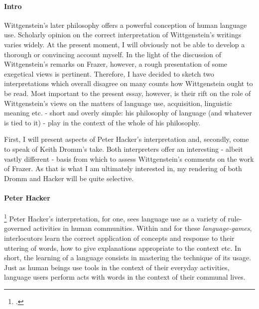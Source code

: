 \documentclass{article}
\begin{document}
\paragraph{Intro} Wittgenstein's later philosophy offers a powerful conception of human language use. Scholarly opinion on the correct interpretation of Wittgenstein's writings varies widely. At the present moment, I will obviously not be able to develop a thorough or convincing account myself. In the light of the discussion of Wittgenstein's remarks on Frazer, however, a rough presentation of some exegetical views is pertinent. Therefore, I have decided to sketch two interpretations which overall disagree on many counts how Wittgenstein ought to be read. Most important to the present essay, however, is their rift on the role of Wittgenstein's views on the matters of language use, acquisition, linguistic meaning etc. - short and overly simple: his philosophy of language (and whatever is tied to it) - play in the context of the whole of his philosophy.

First, I will present aspects of Peter Hacker's interpretation and, secondly, come to speak of Keith Dromm's take. Both interpreters offer an interesting - albeit vastly different - basis from which to assess Wittgenstein's comments on the work of Frazer. As that is what I am ultimately interested in, my rendering of both Dromm and Hacker will be quite selective.

\paragraph{Peter Hacker}\footcite{This section is based on }%
Peter Hacker's interpretation, for one, sees language use as a variety of rule-governed activities in human communities. Within and for these \textit{language-games}, interlocutors learn the correct application of concepts and response to their uttering of words, how to give explanations appropriate to the context etc. In short, the learning of a language consists in mastering the technique of its usage.
Just as human beings use tools in the context of their everyday activities, language users perform acts with words in the context of their communal lives. 
\end{document}
